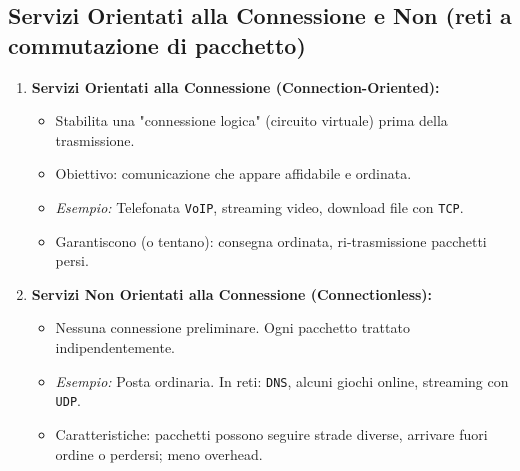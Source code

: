 \subsection{Servizi Orientati alla Connessione e Non (reti a commutazione di pacchetto)}
\begin{enumerate}
    \item \textbf{Servizi Orientati alla Connessione (Connection-Oriented):}
    \begin{itemize}
        \item Stabilita una "connessione logica" (circuito virtuale) prima della trasmissione.
        \item Obiettivo: comunicazione che appare affidabile e ordinata.
        \item \textit{Esempio:} Telefonata \texttt{VoIP}, streaming video, download file con \texttt{TCP}.
        \item Garantiscono (o tentano): consegna ordinata, ri-trasmissione pacchetti persi.
    \end{itemize}
    \item \textbf{Servizi Non Orientati alla Connessione (Connectionless):}
    \begin{itemize}
        \item Nessuna connessione preliminare. Ogni pacchetto trattato indipendentemente.
        \item \textit{Esempio:} Posta ordinaria. In reti: \texttt{DNS}, alcuni giochi online, streaming con \texttt{UDP}.
        \item Caratteristiche: pacchetti possono seguire strade diverse, arrivare fuori ordine o perdersi; meno overhead.
    \end{itemize}
\end{enumerate}

